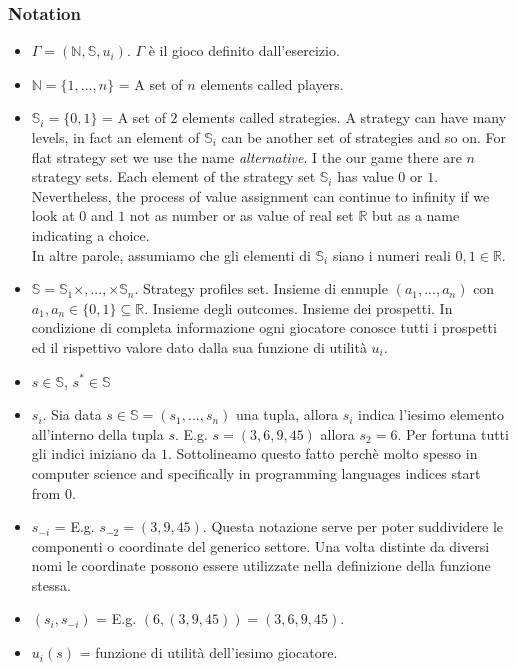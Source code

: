\documentclass{article}
\begin{document}
\subsubsection{Notation}
\begin{itemize}
 \item $\Gamma = (\mathbb{N}, \mathbb{S}, u_i)$. $\Gamma$ \`e il gioco definito dall'esercizio.
 \item $\mathbb{N} = \{1,...,n\}$ = A set of $n$ elements called players.
 \item $\mathbb{S}_i = \{ 0,1 \}$ = A set of $2$ elements called strategies. A strategy can have many levels, in fact an element of $\mathbb{S}_i$ can be another set of strategies and so on. For flat strategy set we use the name \emph{alternative}. I the our game there are $n$ strategy sets. Each element of the strategy set $\mathbb{S}_i$ has value $0$ or $1$. Nevertheless, the process of value assignment can continue to infinity if we look at $0$ and $1$ not as number or as value of real set $\mathbb{R}$ but as a name indicating a choice. \\
 In altre parole, assumiamo che gli elementi di $\mathbb{S}_i$ siano i numeri reali $0,1 \in \mathbb{R}$.
 \item $\mathbb{S} = \mathbb{S}_1 \times, ..., \times \mathbb{S}_n$. Strategy profiles set. Insieme di ennuple $(a_1, ..., a_n)$ con $a_1, a_n \in \{0,1\} \subseteq \mathbb{R}$. Insieme degli outcomes. Insieme dei prospetti. In condizione di completa informazione ogni giocatore conosce tutti i prospetti ed il rispettivo valore dato dalla sua funzione di utilit\`a $u_i$.
 \item $s \in \mathbb{S}$, $s^* \in \mathbb{S}$
 \item $s_i$. Sia data $s \in \mathbb{S} = (s_1, ..., s_n)$ una tupla, allora $s_i$ indica l'iesimo elemento all'interno della tupla $s$. E.g. $s=(3,6,9,45)$ allora $s_2 = 6$. Per fortuna tutti gli indici iniziano da $1$. Sottolineamo questo fatto perch\`e molto spesso in computer science and specifically in programming languages indices start from $0$.
 \item $s_{-i}$ = E.g. $s_{-2} = (3,9,45)$. Questa notazione serve per poter suddividere le componenti o coordinate del generico settore. Una volta distinte da diversi nomi le coordinate possono essere utilizzate nella definizione della funzione stessa.
 \item $(s_i, s_{-i})$ = E.g. $(6,(3,9,45)) = (3,6,9,45)$.
 \item $u_i (s)$ = funzione di utilit\`a dell'iesimo giocatore.
\end{itemize}
\end{document}
